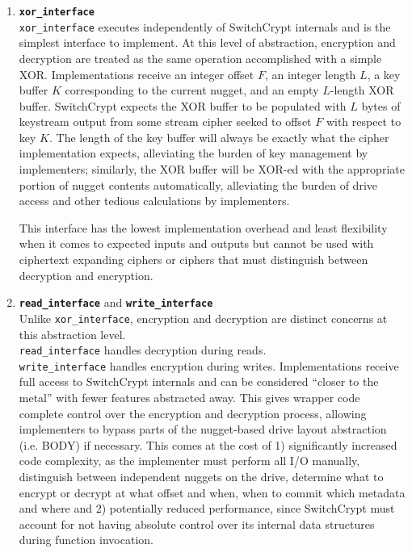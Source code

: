 \begin{enumerate}
   \item \textbf{\texttt{xor\_interface}}\\\texttt{xor\_interface} executes
   independently of SwitchCrypt internals and is the simplest interface to
   implement. At this level of abstraction, encryption and decryption are
   treated as the same operation accomplished with a simple XOR. Implementations
   receive an integer offset $F$, an integer length $L$, a key buffer $K$
   corresponding to the current nugget, and an empty $L$-length XOR buffer.
   SwitchCrypt expects the XOR buffer to be populated with $L$ bytes of
   keystream output from some stream cipher seeked to offset $F$ with respect to
   key $K$. The length of the key buffer will always be exactly what the cipher
   implementation expects, alleviating the burden of key management by
   implementers; similarly, the XOR buffer will be XOR-ed with the appropriate
   portion of nugget contents automatically, alleviating the burden of drive
   access and other tedious calculations by implementers.

   This interface has the lowest implementation overhead and least flexibility
   when it comes to expected inputs and outputs but cannot be used with
   ciphertext expanding ciphers or ciphers that must distinguish between
   decryption and encryption. \\
   \item \textbf{\texttt{read\_interface}} and
   \textbf{\texttt{write\_interface}}\\
   Unlike \texttt{xor\_interface}, encryption and decryption are distinct
   concerns at this abstraction level. \\\texttt{read\_interface} handles
   decryption during reads. \\\texttt{write\_interface} handles encryption
   during writes. Implementations receive full access to SwitchCrypt internals
   and can be considered ``closer to the metal'' with fewer features abstracted
   away. This gives wrapper code complete control over the encryption and
   decryption process, allowing implementers to bypass parts of the nugget-based
   drive layout abstraction (i.e. BODY) if necessary. This comes at the cost of
   1) significantly increased code complexity, as the implementer must perform
   all I/O manually, distinguish between independent nuggets on the drive,
   determine what to encrypt or decrypt at what offset and when, when to commit
   which metadata and where and 2) potentially reduced performance, since
   SwitchCrypt must account for not having absolute control over its internal
   data structures during function invocation.


\end{enumerate}
